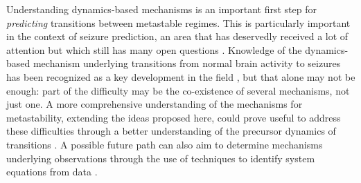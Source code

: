 Understanding dynamics-based mechanisms is an important first step for \textit{predicting} transitions between metastable regimes. This is particularly important in the context of seizure prediction, an area that has deservedly received a lot of attention but which still has many open questions \cite{kuhlmann2018seizure}. Knowledge of the dynamics-based mechanism underlying transitions from normal brain activity to seizures has been recognized as a key development in the field \cite{kuhlmann2018seizure}, but that alone may not be enough: part of the difficulty may be the co-existence of several mechanisms, not just one. A more comprehensive understanding of the mechanisms for metastability, extending the ideas proposed here, could prove useful to address these difficulties through a better understanding of the precursor dynamics of transitions \cite{rings2019traceability}. A possible future path can also aim to determine mechanisms underlying observations through the use of techniques to identify system equations from data \cite{voss2004nonlinear, brunton2016discovering, tabar2019analysis, anvari2016disentangling, jacobs2023hypersindy}. 



